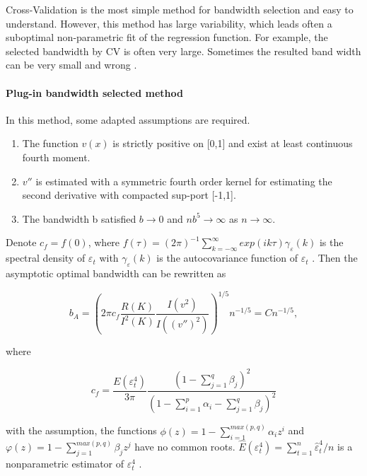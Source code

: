 Cross-Validation is the most simple method for bandwidth selection and easy to understand. However, this method has large variability, which leads often a suboptimal non-parametric fit of the regression function. For example, the selected bandwidth by CV is often very large. Sometimes the resulted band width can be very small and wrong \citep{Altman1995}. 

\paragraph{Plug-in bandwidth selected method}

In this method, some adapted assumptions are required.


\begin{enumerate}
    \item The function $v(x)$ is strictly positive on [0,1] and exist at least continuous fourth moment.    
    \item $v''$ is estimated with a symmetric fourth order kernel for estimating the second derivative with compacted sup-port [-1,1].
    \item The bandwidth b satisfied $b \rightarrow 0$  and $nb^{5} \rightarrow \infty $  as $n \rightarrow \infty$.
\end{enumerate}

Denote $c_{f}=f(0)$, where $f(\tau)=(2\pi)^{-1}\sum_{k=-\infty}^{\infty}exp(ik\tau)\gamma_{\varepsilon}(k)$ is the spectral density of $\varepsilon_{t}$  with $\gamma_{\varepsilon}(k)$ is the autocovariance function of $\varepsilon_{t}$ . Then the asymptotic optimal bandwidth can be rewritten as 

\begin{equation}
b_{A} =(2\pi c_{f} \frac{R(K)}{I^{2}(K)}\frac{I(v^{2})}{I((v'')^2)})^{1/5}n^{-1/5} = Cn^{-1/5},
\end{equation}

where

\begin{equation}
c_{f}=\frac{E(\varepsilon_{t}^{4})}{3\pi}\frac{(1-\sum_{j=1}^{q}\beta_{j})^{2}}{(1-\sum_{i=1}^{p}\alpha_{i}-\sum_{j=1}^{q}\beta_{j})^{2}}
\end{equation}
 
with the assumption, the functions $\phi(z)=1-\sum_{i=1}^{max(p,q)}\alpha_{i}z^{i}$ and $\varphi(z)=1-\sum_{j=1}^{max(p,q)}\beta_{j}z^{j}$ have no common roots. $\hat{E}(\varepsilon_t^{4})=\sum_{t=1}^{n}\hat{\varepsilon}_{t}^{4}/n$ is a nonparametric estimator of $\varepsilon_{t}^{4}$ \citep{Feng2004}.

